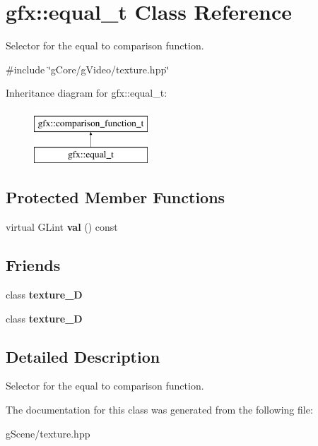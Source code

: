 \hypertarget{classgfx_1_1equal__t}{\section{gfx\-:\-:equal\-\_\-t Class Reference}
\label{classgfx_1_1equal__t}
}


Selector for the equal to comparison function.  




{\ttfamily \#include \char`\"{}g\-Core/g\-Video/texture.\-hpp\char`\"{}}

Inheritance diagram for gfx\-:\-:equal\-\_\-t\-:\begin{figure}[H]
\begin{center}
\leavevmode
\includegraphics[height=2.000000cm]{classgfx_1_1equal__t}
\end{center}
\end{figure}
\subsection*{Protected Member Functions}
\begin{DoxyCompactItemize}
\item 
\hypertarget{classgfx_1_1equal__t_a86259aec05c6504aab05ac74424b146f}{virtual G\-Lint {\bfseries val} () const }\label{classgfx_1_1equal__t_a86259aec05c6504aab05ac74424b146f}

\end{DoxyCompactItemize}
\subsection*{Friends}
\begin{DoxyCompactItemize}
\item 
\hypertarget{classgfx_1_1equal__t_a2039d67f6166ccf823c78e3476aad9aa}{class {\bfseries texture\-\_\-D}}\label{classgfx_1_1equal__t_a2039d67f6166ccf823c78e3476aad9aa}

\item 
\hypertarget{classgfx_1_1equal__t_a22ad86ef46c3b17357a0cd59e50bc7dd}{class {\bfseries texture\-\_\-D}}\label{classgfx_1_1equal__t_a22ad86ef46c3b17357a0cd59e50bc7dd}

\end{DoxyCompactItemize}


\subsection{Detailed Description}
Selector for the equal to comparison function. 

The documentation for this class was generated from the following file\-:\begin{DoxyCompactItemize}
\item 
g\-Scene/texture.\-hpp\end{DoxyCompactItemize}
